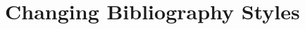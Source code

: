 \documentclass[twocolumn]{article}
\begin{document}
\section{Changing Bibliography Styles}



\end{document}
